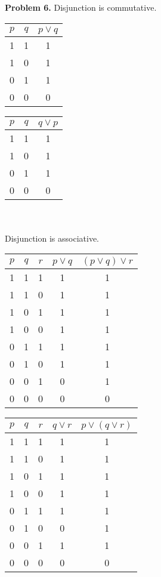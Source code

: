 \documentclass[a4paper,12pt]{article}
\newenvironment{problem}[1]{\par\bigskip\noindent\textbf{Problem #1.} \newline}{}
\begin{document}
  \begin{problem}{6}
    Disjunction is commutative.
    \begin{tabular}{|c|c|c|}
      \hline          
      $p$ & $q$ & $p \vee q$\\
      \hline  
      1&1&1\\
      \hline  
      1&0&1\\
      \hline
      0&1&1\\
      \hline
      0&0&0\\
      \hline
    \end{tabular}
    \begin{tabular}{|c|c|c|}
      \hline          
      $p$ & $q$ & $q \vee p$\\
      \hline  
      1&1&1\\
      \hline  
      1&0&1\\
      \hline
      0&1&1\\
      \hline
      0&0&0\\
      \hline
    \end{tabular}\\\\
    
    Disjunction is associative.
    \begin{tabular}{|c|c|c|c|c|}
      \hline          
      $p$ & $q$ & $r$ & $p \vee q$ & $(p \vee q) \vee r$\\
      \hline  
      1&1&1&1&1\\
      \hline  
      1&1&0&1&1\\
      \hline
      1&0&1&1&1\\
      \hline
      1&0&0&1&1\\
      \hline
      0&1&1&1&1\\
      \hline
      0&1&0&1&1\\
      \hline
      0&0&1&0&1\\
      \hline
      0&0&0&0&0\\
      \hline
    \end{tabular}
    \begin{tabular}{|c|c|c|c|c|}
      \hline          
      $p$ & $q$ & $r$ & $q \vee r$ & $p \vee (q \vee r)$\\
      \hline  
      1&1&1&1&1\\
      \hline  
      1&1&0&1&1\\
      \hline
      1&0&1&1&1\\
      \hline
      1&0&0&1&1\\
      \hline
      0&1&1&1&1\\
      \hline
      0&1&0&0&1\\
      \hline
      0&0&1&1&1\\
      \hline
      0&0&0&0&0\\
      \hline
    \end{tabular}\\\\
  \end{problem}
\end{document}
